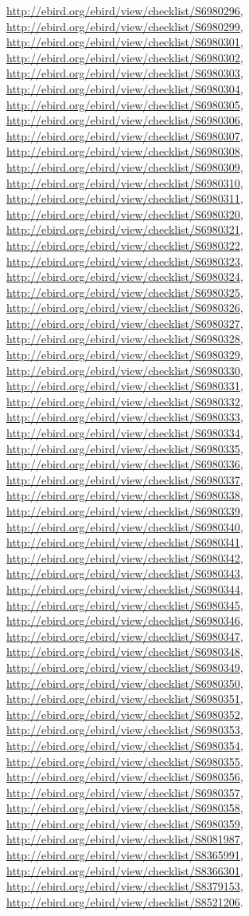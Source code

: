 \documentclass[9pt, article]{memoir}
\begin{document}
\begin{multicols}{2}
\url{http://ebird.org/ebird/view/checklist/S6980296}, 
\url{http://ebird.org/ebird/view/checklist/S6980299}, 
\url{http://ebird.org/ebird/view/checklist/S6980301}, 
\url{http://ebird.org/ebird/view/checklist/S6980302}, 
\url{http://ebird.org/ebird/view/checklist/S6980303}, 
\url{http://ebird.org/ebird/view/checklist/S6980304}, 
\url{http://ebird.org/ebird/view/checklist/S6980305}, 
\url{http://ebird.org/ebird/view/checklist/S6980306}, 
\url{http://ebird.org/ebird/view/checklist/S6980307}, 
\url{http://ebird.org/ebird/view/checklist/S6980308}, 
\url{http://ebird.org/ebird/view/checklist/S6980309}, 
\url{http://ebird.org/ebird/view/checklist/S6980310}, 
\url{http://ebird.org/ebird/view/checklist/S6980311}, 
\url{http://ebird.org/ebird/view/checklist/S6980320}, 
\url{http://ebird.org/ebird/view/checklist/S6980321}, 
\url{http://ebird.org/ebird/view/checklist/S6980322}, 
\url{http://ebird.org/ebird/view/checklist/S6980323}, 
\url{http://ebird.org/ebird/view/checklist/S6980324}, 
\url{http://ebird.org/ebird/view/checklist/S6980325}, 
\url{http://ebird.org/ebird/view/checklist/S6980326}, 
\url{http://ebird.org/ebird/view/checklist/S6980327}, 
\url{http://ebird.org/ebird/view/checklist/S6980328}, 
\url{http://ebird.org/ebird/view/checklist/S6980329}, 
\url{http://ebird.org/ebird/view/checklist/S6980330}, 
\url{http://ebird.org/ebird/view/checklist/S6980331}, 
\url{http://ebird.org/ebird/view/checklist/S6980332}, 
\url{http://ebird.org/ebird/view/checklist/S6980333}, 
\url{http://ebird.org/ebird/view/checklist/S6980334}, 
\url{http://ebird.org/ebird/view/checklist/S6980335}, 
\url{http://ebird.org/ebird/view/checklist/S6980336}, 
\url{http://ebird.org/ebird/view/checklist/S6980337}, 
\url{http://ebird.org/ebird/view/checklist/S6980338}, 
\url{http://ebird.org/ebird/view/checklist/S6980339}, 
\url{http://ebird.org/ebird/view/checklist/S6980340}, 
\url{http://ebird.org/ebird/view/checklist/S6980341}, 
\url{http://ebird.org/ebird/view/checklist/S6980342}, 
\url{http://ebird.org/ebird/view/checklist/S6980343}, 
\url{http://ebird.org/ebird/view/checklist/S6980344}, 
\url{http://ebird.org/ebird/view/checklist/S6980345}, 
\url{http://ebird.org/ebird/view/checklist/S6980346}, 
\url{http://ebird.org/ebird/view/checklist/S6980347}, 
\url{http://ebird.org/ebird/view/checklist/S6980348}, 
\url{http://ebird.org/ebird/view/checklist/S6980349}, 
\url{http://ebird.org/ebird/view/checklist/S6980350}, 
\url{http://ebird.org/ebird/view/checklist/S6980351}, 
\url{http://ebird.org/ebird/view/checklist/S6980352}, 
\url{http://ebird.org/ebird/view/checklist/S6980353}, 
\url{http://ebird.org/ebird/view/checklist/S6980354}, 
\url{http://ebird.org/ebird/view/checklist/S6980355}, 
\url{http://ebird.org/ebird/view/checklist/S6980356}, 
\url{http://ebird.org/ebird/view/checklist/S6980357}, 
\url{http://ebird.org/ebird/view/checklist/S6980358}, 
\url{http://ebird.org/ebird/view/checklist/S6980359}, 
\url{http://ebird.org/ebird/view/checklist/S8081987}, 
\url{http://ebird.org/ebird/view/checklist/S8365991}, 
\url{http://ebird.org/ebird/view/checklist/S8366301}, 
\url{http://ebird.org/ebird/view/checklist/S8379153}, 
\url{http://ebird.org/ebird/view/checklist/S8521206}.


\end{multicols}
\end{document}
